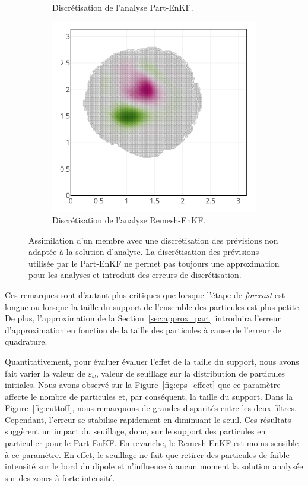 \begin{figure}
\begin{subfigure}{0.32\textwidth}
        \caption{Discrétisation de l'analyse Part-EnKF.}
    \end{subfigure}
    \hfill
    \begin{subfigure}{0.32\textwidth}
        \centering
        \includegraphics[width=\linewidth]{./images/app2d/assim_member_rmf.png}
        \caption{Discrétisation de l'analyse Remesh-EnKF.}
    \end{subfigure}
    \caption{Assimilation d'un membre avec une discrétisation des prévisions non adaptée à la solution d'analyse. La discrétisation des prévisions utilisée par le Part-EnKF ne permet pas toujours une approximation pour les analyses et introduit des erreurs de discrétisation.}
    \label{fig:assim_member}
\end{figure}

Ces remarques sont d'autant plus critiques que lorsque l'étape de \textit{forecast} est longue ou lorsque la taille du support de l'ensemble des particules est plus petite. De plus, l'approximation de la Section~\ref{sec:approx_part} introduira l'erreur d'approximation en fonction de la taille des particules à cause de l'erreur de quadrature.


Quantitativement, pour évaluer évaluer l'effet de la taille du support, nous avons fait varier la valeur de $\varepsilon_{\omega}$, valeur de seuillage sur la distribution de particules initiales. Nous avons observé sur la Figure~\ref{fig:eps_effect} que ce paramètre affecte le nombre de particules et, par conséquent, la taille du support. Dans la Figure~\ref{fig:cuttoff}, nous remarquons de grandes disparités entre les deux filtres. Cependant, l'erreur se stabilise rapidement en diminuant le seuil. Ces résultats suggèrent un impact du seuillage, donc, sur le support des particules en particulier pour le Part-EnKF. En revanche, le Remesh-EnKF est moins sensible à ce paramètre. En effet, le seuillage ne fait que retirer des particules de faible intensité sur le bord du dipole et n'influence à aucun moment la solution analysée sur des zones à forte intensité.

